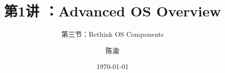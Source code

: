 


\title[第1讲]{第1讲 ：Advanced OS Overview} %
\subtitle{第三节：Rethink OS Components}
\author{陈渝} %
\date{\today} %




\begin{frame}
\titlepage %
\end{frame}

